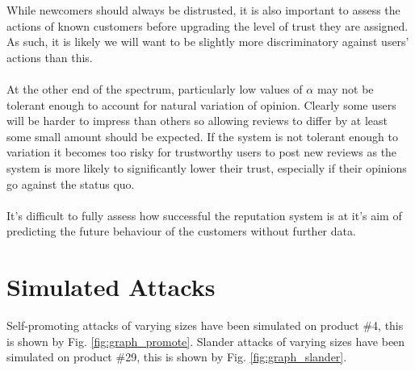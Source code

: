 \documentclass{article}
\begin{document}
While newcomers should always be distrusted\cite{reputation_systems}, it is also important to assess the actions of known customers before upgrading the level of trust they are assigned. As such, it is likely we will want to be slightly more discriminatory against users' actions than this.
\\\\
At the other end of the spectrum, particularly low values of $\alpha$ may not be tolerant enough to account for natural variation of opinion. Clearly some users will be harder to impress than others so allowing reviews to differ by at least some small amount should be expected. If the system is not tolerant enough to variation it becomes too risky for trustworthy users to post new reviews\cite{survey_and_taxonomy} as the system is more likely to significantly lower their trust, especially if their opinions go against the status quo.
\\\\
It's difficult to fully assess how successful the reputation system is at it's aim of predicting the future behaviour of the customers without further data.

\section{Simulated Attacks} %
\label{attacks}
Self-promoting attacks of varying sizes have been simulated on product \#4, this is shown by Fig. \ref{fig:graph_promote}.
Slander attacks of varying sizes have been simulated on product \#29, this is shown by Fig. \ref{fig:graph_slander}.
\end{document}

